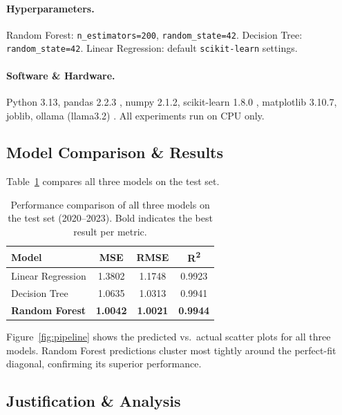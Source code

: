 \documentclass{article}
\begin{document}
\paragraph{Hyperparameters.}
Random Forest: \texttt{n\_estimators=200}, \texttt{random\_state=42}.
Decision Tree: \texttt{random\_state=42}.
Linear Regression: default \texttt{scikit-learn} settings.

\paragraph{Software \& Hardware.}
Python 3.13, pandas 2.2.3 \cite{mckinney2010data}, numpy 2.1.2,
scikit-learn 1.8.0 \cite{pedregosa2011scikit}, matplotlib 3.10.7, joblib, ollama
(llama3.2) \cite{ollama2024}. All experiments run on CPU only.

\subsection{Model Comparison \& Results}

Table~\ref{tab:results} compares all three models on the test set.

\begin{table}[H]
  \centering
  \caption{Performance comparison of all three models on the test set (2020--2023).
  Bold indicates the best result per metric.}
  \label{tab:results}
  \begin{tabular}{lccc}
    \toprule
    \textbf{Model} & \textbf{MSE} & \textbf{RMSE} & \textbf{R\textsuperscript{2}} \\
    \midrule
    Linear Regression        & 1.3802          & 1.1748          & 0.9923 \\
    Decision Tree            & 1.0635          & 1.0313          & 0.9941 \\
    \textbf{Random Forest}   & \textbf{1.0042} & \textbf{1.0021} & \textbf{0.9944} \\
    \bottomrule
  \end{tabular}
\end{table}

Figure~\ref{fig:pipeline} shows the predicted vs.\ actual scatter plots for all
three models. Random Forest predictions cluster most tightly around the perfect-fit
diagonal, confirming its superior performance.

\subsection{Justification \& Analysis}
\end{document}
